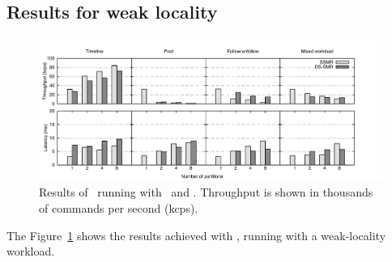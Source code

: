 \subsection{Results for weak locality} \label{sec:dssmr-evaluation:weakloc}

\begin{figure}
\begin{minipage}[b]{1\linewidth}
\centering
      \includegraphics[width=1.08\linewidth]{figures/experiments/dssmr/weak-locality}
\end{minipage}
\caption{Results of \dssmrappname\ running with \ssmr\ and \dssmr{}. Throughput is shown in thousands of commands per second (kcps).}
\label{fig:dssmr-weakloc}
\end{figure}

The Figure~\ref{fig:dssmr-weakloc} shows the results achieved with
\dssmrappname{}, running with a weak-locality workload.
